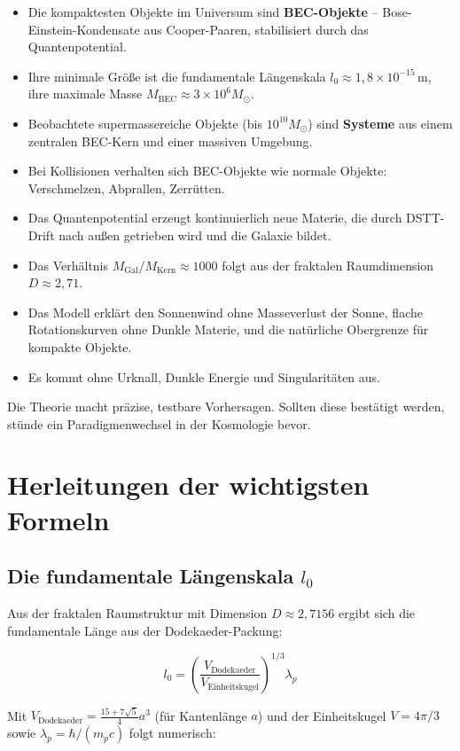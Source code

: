\documentclass[12pt,a4paper]{article}
\begin{document}
\begin{itemize}
\item Die kompaktesten Objekte im Universum sind \textbf{BEC-Objekte} – Bose-Einstein-Kondensate aus Cooper-Paaren, stabilisiert durch das Quantenpotential.
\item Ihre minimale Größe ist die fundamentale Längenskala $l_0 \approx 1{,}8 \times 10^{-15}\,\text{m}$, ihre maximale Masse $M_{\text{BEC}} \approx 3 \times 10^6 M_\odot$.
\item Beobachtete supermassereiche Objekte (bis $10^{10} M_\odot$) sind \textbf{Systeme} aus einem zentralen BEC-Kern und einer massiven Umgebung.
\item Bei Kollisionen verhalten sich BEC-Objekte wie normale Objekte: Verschmelzen, Abprallen, Zerrütten.
\item Das Quantenpotential erzeugt kontinuierlich neue Materie, die durch DSTT-Drift nach außen getrieben wird und die Galaxie bildet.
\item Das Verhältnis $M_{\text{Gal}}/M_{\text{Kern}} \approx 1000$ folgt aus der fraktalen Raumdimension $D\approx2{,}71$.
\item Das Modell erklärt den Sonnenwind ohne Masseverlust der Sonne, flache Rotationskurven ohne Dunkle Materie, und die natürliche Obergrenze für kompakte Objekte.
\item Es kommt ohne Urknall, Dunkle Energie und Singularitäten aus.
\end{itemize}

Die Theorie macht präzise, testbare Vorhersagen. Sollten diese bestätigt werden, stünde ein Paradigmenwechsel in der Kosmologie bevor.

\appendix
\section{Herleitungen der wichtigsten Formeln}

\subsection{Die fundamentale Längenskala $l_0$}

Aus der fraktalen Raumstruktur mit Dimension $D \approx 2{,}7156$ ergibt sich die fundamentale Länge aus der Dodekaeder-Packung:

\[
l_0 = \left( \frac{V_{\text{Dodekaeder}}}{V_{\text{Einheitskugel}}} \right)^{1/3} \lambda_p
\]

Mit $V_{\text{Dodekaeder}} = \frac{15 + 7\sqrt{5}}{4} a^3$ (für Kantenlänge $a$) und der Einheitskugel $V = 4\pi/3$ sowie $\lambda_p = \hbar/(m_p c)$ folgt numerisch:
\end{document}
